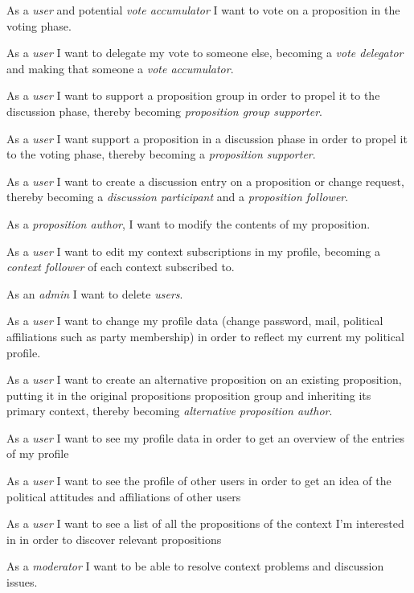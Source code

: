 As a \textit{user} and potential \textit{vote accumulator} I want to vote on a proposition in the voting phase.

As a \textit{user} I want to delegate my vote to someone else, becoming a \textit{vote delegator} and making that someone a \textit{vote accumulator}.

As a \textit{user} I want to support a proposition group in order to propel it to the discussion phase, thereby becoming \textit{proposition group supporter}.

 As a \textit{user} I want support a proposition in a discussion phase in order to propel it to the voting phase, thereby becoming a \textit{proposition supporter}.

 As a \textit{user} I want to create a discussion entry on a proposition or change request, thereby becoming a \textit{discussion participant} and a \textit{proposition follower}.

 As a \textit{proposition author}, I want to modify the contents of my proposition.

 As a \textit{user} I want to edit my context subscriptions in my profile, becoming a \textit{context follower} of each context subscribed to.

 As an \textit{admin} I want to delete \textit{users}.

 As a \textit{user} I want to change my profile data (change password, mail, political affiliations such as party membership) in order to reflect my current my political profile.
 
 As a \textit{user} I want to create an alternative proposition on an existing proposition, putting it in the original propositions proposition group and inheriting its primary context, thereby becoming \textit{alternative proposition author}.

 As a \textit{user} I want to see my profile data in order to get an overview of the entries of my profile

 As a \textit{user} I want to see the profile of other users in order to get an idea of the political attitudes and affiliations of other users

 As a \textit{user} I want to see a list of all the propositions of the context I’m interested in in order to discover relevant propositions

 As a \textit{moderator} I want to be able to resolve context problems and discussion issues.

